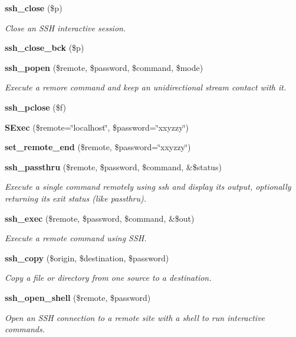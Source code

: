 \begin{CompactItemize}
{\bf ssh\_\-close} (\$p)
\begin{CompactList}\small\item\em Close an SSH interactive session. \item\end{CompactList}\item 
{\bf ssh\_\-close\_\-bck} (\$p)
\item 
{\bf ssh\_\-popen} (\$remote, \$password, \$command, \$mode)
\begin{CompactList}\small\item\em Execute a remore command and keep an unidirectional stream contact with it. \item\end{CompactList}\item 
{\bf ssh\_\-pclose} (\$f)
\item 
{\bf SExec} (\$remote=\char`\"{}localhost\char`\"{}, \$password=\char`\"{}xxyzzy\char`\"{})
\item 
{\bf set\_\-remote\_\-end} (\$remote, \$password=\char`\"{}xxyzzy\char`\"{})
\item 
{\bf ssh\_\-passthru} (\$remote, \$password, \$command, \&\$status)
\begin{CompactList}\small\item\em Execute a single command remotely using ssh and display its output, optionally returning its exit status (like passthru). \item\end{CompactList}\item 
{\bf ssh\_\-exec} (\$remote, \$password, \$command, \&\$out)
\begin{CompactList}\small\item\em Execute a remote command using SSH. \item\end{CompactList}\item 
{\bf ssh\_\-copy} (\$origin, \$destination, \$password)
\begin{CompactList}\small\item\em Copy a file or directory from one source to a destination. \item\end{CompactList}\item 
{\bf ssh\_\-open\_\-shell} (\$remote, \$password)
\begin{CompactList}\small\item\em Open an SSH connection to a remote site with a shell to run interactive commands. \item\end{CompactList}\item 

\end{CompactItemize}
